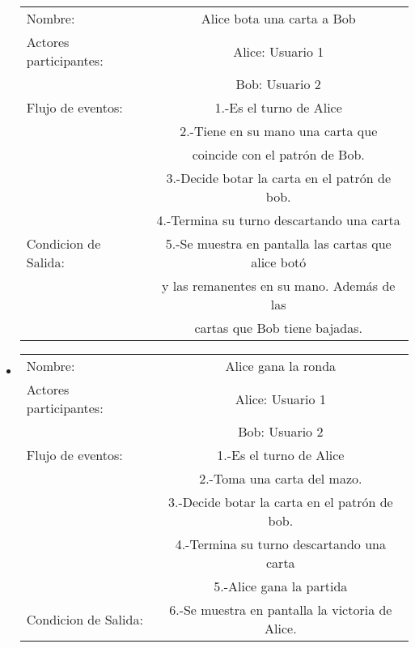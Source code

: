 \begin{itemize}
        \begin{tabular}{ l | c  }
            Nombre:            & Alice bota una carta a Bob\\
            Actores participantes: & Alice: Usuario  1                                              \\
                                            & Bob: Usuario  2                                              \\\hline
            Flujo de eventos:               & 1.-Es el turno de Alice                                 \\
                                            & 2.-Tiene en su mano una carta que\\ & coincide con el patrón de Bob.\\
                                            & 3.-Decide botar la carta en el patrón de bob. \\
                                            & 4.-Termina su turno descartando una carta               \\
            Condicion de Salida:            & 5.-Se muestra en pantalla las cartas que alice botó\\
                                                & y las remanentes en su mano. Además de las \\ & cartas que Bob tiene bajadas.             \\\hline
            \hline
        \end{tabular}
\item
        \begin{tabular}{ l | c  }
            Nombre:            & Alice gana la ronda\\
            Actores participantes: & Alice: Usuario  1 \\
                                            & Bob: Usuario  2  \\\hline
            Flujo de eventos:               & 1.-Es el turno de Alice                                 \\
                                            & 2.-Toma una carta del mazo.\\\hline
                                            & 3.-Decide botar la carta en el patrón de bob. \\\hline
                                            & 4.-Termina su turno descartando una carta \\\hline
                                            & 5.-Alice gana la partida \\\hline
            Condicion de Salida:            & 6.-Se muestra en pantalla la victoria de Alice. \\\hline
        \end{tabular}
            
\end{itemize}
